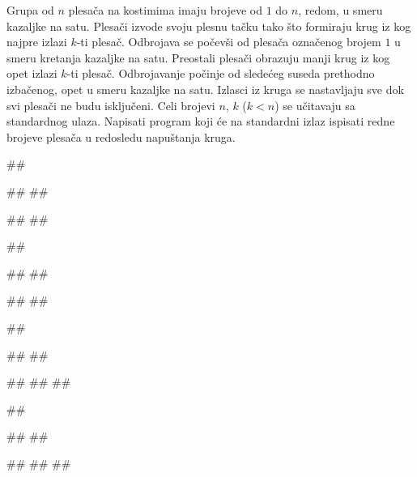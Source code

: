 \begin{Exercise}[label=612]
Grupa od $n$ plesača na kostimima imaju brojeve od $1$ do $n$, redom, u smeru kazaljke na satu.
Plesači izvode svoju plesnu tačku tako što formiraju krug iz kog najpre izlazi $k$-ti plesač.
Odbrojava se počevši od plesača označenog brojem $1$ u smeru kretanja kazaljke na satu. 
Preostali plesači obrazuju manji krug iz kog opet izlazi $k$-ti plesač. Odbrojavanje počinje od
sledećeg suseda prethodno izbačenog, opet u smeru kazaljke na satu. Izlasci iz kruga se nastavljaju
sve dok svi plesači ne budu isključeni. 
Celi brojevi $n$, $k$ ($k < n$) se učitavaju sa standardnog ulaza. 
Napisati program koji će na standardni izlaz ispisati redne brojeve plesača u redosledu napuštanja kruga. 

\noindent
\begin{minitest}
\begin{test}{1}
##

#\naslovUlaz#
##

#\naslovIzlaz# 
##
\end{test}
\end{minitest}
\begin{minitest}
\begin{test}{2}
##

#\naslovUlaz#
##

#\naslovIzlaz# 
## 
\end{test}
\end{minitest}
\begin{minitest}
\begin{test}{3}
##

#\naslovUlaz#
##

#\naslovIzlaz# 
##
##
\end{test}
\end{minitest}
\begin{minitest}
\begin{test}{4}
##

#\naslovUlaz#
##

#\naslovIzlaz# 
##
##
\end{test}
\end{minitest}
\end{Exercise}

